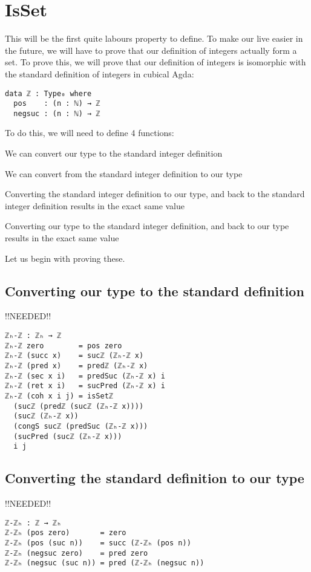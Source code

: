 \section{IsSet}
This will be the first quite labours property to define. To make our live easier in the future, we will have to prove that our definition of integers actually form a set. To prove this, we will prove that our definition of integers is isomorphic with the standard definition of integers in cubical Agda:
\begin{verbatim}
data ℤ : Type₀ where
  pos    : (n : ℕ) → ℤ
  negsuc : (n : ℕ) → ℤ
\end{verbatim}
To do this, we will need to define 4 functions:
\begin{compactitem}
  \item We can convert our type to the standard integer definition
  \item We can convert from the standard integer definition to our type
  \item Converting the standard integer definition to our type, and back to the standard integer definition results in the exact same value
  \item Converting our type to the standard integer definition, and back to our type results in the exact same value
\end{compactitem}
Let us begin with proving these.

\subsection{Converting our type to the standard definition}
!!NEEDED!!
\begin{verbatim}
ℤₕ-ℤ : ℤₕ → ℤ
ℤₕ-ℤ zero        = pos zero
ℤₕ-ℤ (succ x)    = sucℤ (ℤₕ-ℤ x)
ℤₕ-ℤ (pred x)    = predℤ (ℤₕ-ℤ x)
ℤₕ-ℤ (sec x i)   = predSuc (ℤₕ-ℤ x) i
ℤₕ-ℤ (ret x i)   = sucPred (ℤₕ-ℤ x) i
ℤₕ-ℤ (coh x i j) = isSetℤ
  (sucℤ (predℤ (sucℤ (ℤₕ-ℤ x))))
  (sucℤ (ℤₕ-ℤ x))
  (congS sucℤ (predSuc (ℤₕ-ℤ x)))
  (sucPred (sucℤ (ℤₕ-ℤ x)))
  i j
\end{verbatim}

\subsection{Converting the standard definition to our type}
!!NEEDED!!
\begin{verbatim}
ℤ-ℤₕ : ℤ → ℤₕ
ℤ-ℤₕ (pos zero)       = zero
ℤ-ℤₕ (pos (suc n))    = succ (ℤ-ℤₕ (pos n))
ℤ-ℤₕ (negsuc zero)    = pred zero
ℤ-ℤₕ (negsuc (suc n)) = pred (ℤ-ℤₕ (negsuc n))
\end{verbatim}


